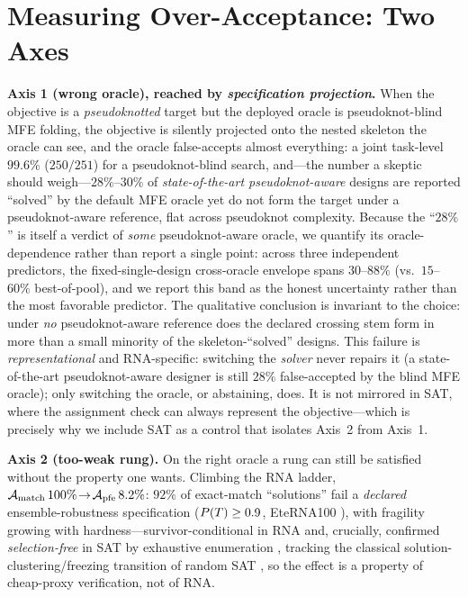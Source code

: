 \section{Measuring Over-Acceptance: Two Axes}
\textbf{Axis 1 (wrong oracle), reached by \emph{specification projection}.} When the objective is a
\emph{pseudoknotted} target but the deployed oracle is pseudoknot-blind MFE folding, the objective is
silently projected onto the nested skeleton the oracle can see, and the oracle false-accepts almost
everything: a joint task-level $99.6\%$ ($250/251$) for a pseudoknot-blind search, and---the number a
skeptic should weigh---$28\%$--$30\%$ of \emph{state-of-the-art pseudoknot-aware} designs are reported
``solved'' by the default MFE oracle yet do not form the target under a pseudoknot-aware reference, flat
across pseudoknot complexity. Because the ``$28\%$'' is itself a
verdict of \emph{some} pseudoknot-aware oracle, we quantify its oracle-dependence rather than report a single
point: across three independent predictors, the fixed-single-design cross-oracle envelope spans $30$--$88\%$
(vs.\ $15$--$60\%$ best-of-pool), and we report this band as the honest uncertainty rather than the most
favorable predictor. The qualitative conclusion is invariant to the choice: under \emph{no} pseudoknot-aware
reference does the declared crossing stem form in more than a small minority of the skeleton-``solved''
designs. This failure is \emph{representational} and RNA-specific: switching the \emph{solver} never repairs
it (a state-of-the-art pseudoknot-aware designer is still $28\%$ false-accepted by the blind MFE oracle);
only switching the oracle, or abstaining, does. It is not mirrored in SAT, where the assignment check can
always represent the objective---which is precisely why we include SAT as a control that isolates Axis~2 from
Axis~1.

\textbf{Axis 2 (too-weak rung).} On the right oracle a rung can still be satisfied without the property one
wants. Climbing the RNA ladder, $\mathcal{A}_{\mathrm{match}}\,100\%\!\to\!\mathcal{A}_{\mathrm{pfe}}\,8.2\%$: $92\%$ of exact-match ``solutions'' fail a
\emph{declared} ensemble-robustness specification ($P(T)\ge0.9$, EteRNA100 \citep{eterna100v2}), with fragility
growing with hardness---survivor-conditional in RNA and, crucially, confirmed \emph{selection-free} in SAT by
exhaustive enumeration \citep{ardelius2008exhaustive}, tracking the classical solution-clustering/freezing
transition of random SAT \citep{krzakala2007clustering,zhou2008frozen}, so the effect is a property of
cheap-proxy verification, not of RNA.

